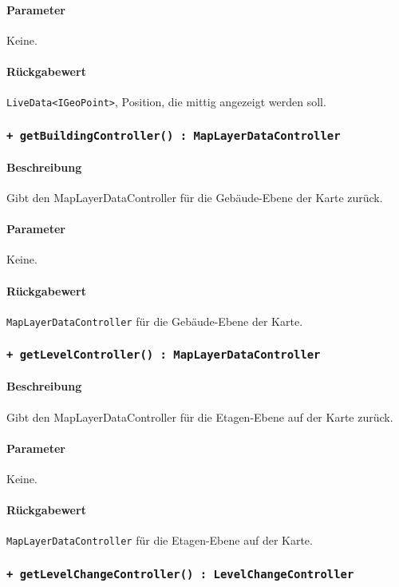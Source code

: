 \paragraph*{Parameter}
Keine.
\paragraph*{Rückgabewert}
\texttt{LiveData<IGeoPoint>}, Position, die mittig angezeigt werden soll.

\subsubsection*{\texttt{+ getBuildingController() : MapLayerDataController}}\label{App_Map_ViewModel_getBuildingController}%
\paragraph*{Beschreibung}
Gibt den MapLayerDataController für die Gebäude-Ebene der Karte zurück.
\paragraph*{Parameter}
Keine.
\paragraph*{Rückgabewert}
\texttt{MapLayerDataController} für die Gebäude-Ebene der Karte.

\subsubsection*{\texttt{+ getLevelController() : MapLayerDataController}}\label{App_Map_ViewModel_getLevelController}%
\paragraph*{Beschreibung}
Gibt den MapLayerDataController für die Etagen-Ebene auf der Karte zurück.
\paragraph*{Parameter}
Keine.
\paragraph*{Rückgabewert}
\texttt{MapLayerDataController} für die Etagen-Ebene auf der Karte.

\subsubsection*{\texttt{+ getLevelChangeController() : LevelChangeController}}\label{App_Map_ViewModel_getLevelChangeController}%
